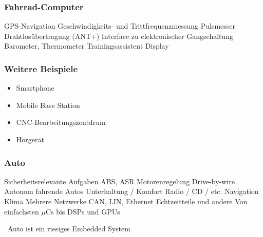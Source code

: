 \begin{minipage}[t]{0.48\columnwidth}
    \subsubsection*{Fahrrad-Computer}

    \begin{outline}
        \1 GPS-Navigation
        \1 Geschwindigkeits- und Trittfrequenzmessung
        \1 Pulsmesser
        \1 Drahtlosübertragung (ANT+)
        \1 Interface zu elektronischer Gangschaltung
        \1 Barometer, Thermometer
        \1 Trainingsassistent
        \1 Display
    \end{outline}

    \subsubsection*{Weitere Beispiele}

    \begin{itemize}
        \item Smartphone
        \item Mobile Base Station
        \item CNC-Bearbeitungszentdrum
        \item Hörgerät
    \end{itemize}
\end{minipage}
\hfill
\begin{minipage}[t]{0.48\columnwidth}
    \subsubsection*{Auto}

    \begin{outline}
        \1 Sicherheitsrelevante Aufgaben
            \2 ABS, ASR
            \2 Motorenregelung
            \2 Drive-by-wire
            \2 Autonom fahrende Autos
        \1 Unterhaltung / Komfort
            \2 Radio / CD / etc.
            \2 Navigation
            \2 Klima
        \1 Mehrere Netzwerke
            \2 CAN, LIN, Ethernet
        \1 Echtzeitteile und andere
        \1 Von einfachsten $\mu$Cs bis DSPs und GPUs 
    \end{outline}

    \textrightarrow\ Auto ist ein riesiges Embedded System
\end{minipage}


